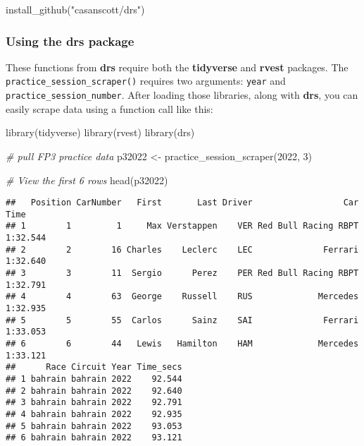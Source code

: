 \documentclass[
]{book}
\newenvironment{Shaded}{\begin{snugshade}}{\end{snugshade}}
\newcommand{\CommentTok}[1]{\textcolor[rgb]{0.56,0.35,0.01}{\textit{#1}}}
\newcommand{\DecValTok}[1]{\textcolor[rgb]{0.00,0.00,0.81}{#1}}
\newcommand{\FunctionTok}[1]{\textcolor[rgb]{0.00,0.00,0.00}{#1}}
\newcommand{\NormalTok}[1]{#1}
\newcommand{\OtherTok}[1]{\textcolor[rgb]{0.56,0.35,0.01}{#1}}
\newcommand{\StringTok}[1]{\textcolor[rgb]{0.31,0.60,0.02}{#1}}
\begin{document}
\begin{Shaded}
\begin{Highlighting}[]
\FunctionTok{install\_github}\NormalTok{(}\StringTok{"casanscott/drs"}\NormalTok{)}
\end{Highlighting}
\end{Shaded}

\hypertarget{using-the-drs-package}{%
\subsubsection{Using the drs package}\label{using-the-drs-package}}

These functions from \textbf{drs} require both the \textbf{tidyverse} and \textbf{rvest} packages. The \texttt{practice\_session\_scraper()} requires two arguments: \texttt{year} and \texttt{practice\_session\_number}. After loading those libraries, along with \textbf{drs}, you can easily scrape data using a function call like this:

\begin{Shaded}
\begin{Highlighting}[]
\FunctionTok{library}\NormalTok{(tidyverse)}
\FunctionTok{library}\NormalTok{(rvest)}
\FunctionTok{library}\NormalTok{(drs)}

\CommentTok{\# pull FP3 practice data}
\NormalTok{p32022 }\OtherTok{\textless{}{-}} \FunctionTok{practice\_session\_scraper}\NormalTok{(}\DecValTok{2022}\NormalTok{, }\DecValTok{3}\NormalTok{)}

\CommentTok{\# View the first 6 rows}
\FunctionTok{head}\NormalTok{(p32022)}
\end{Highlighting}
\end{Shaded}

\begin{verbatim}
##   Position CarNumber   First       Last Driver                  Car     Time
## 1        1         1     Max Verstappen    VER Red Bull Racing RBPT 1:32.544
## 2        2        16 Charles    Leclerc    LEC              Ferrari 1:32.640
## 3        3        11  Sergio      Perez    PER Red Bull Racing RBPT 1:32.791
## 4        4        63  George    Russell    RUS             Mercedes 1:32.935
## 5        5        55  Carlos      Sainz    SAI              Ferrari 1:33.053
## 6        6        44   Lewis   Hamilton    HAM             Mercedes 1:33.121
##      Race Circuit Year Time_secs
## 1 bahrain bahrain 2022    92.544
## 2 bahrain bahrain 2022    92.640
## 3 bahrain bahrain 2022    92.791
## 4 bahrain bahrain 2022    92.935
## 5 bahrain bahrain 2022    93.053
## 6 bahrain bahrain 2022    93.121
\end{verbatim}
\end{document}
